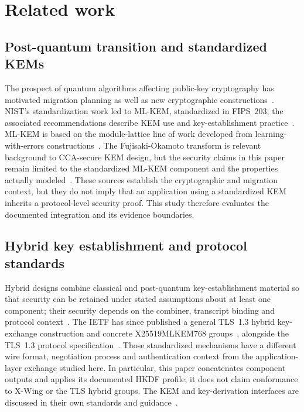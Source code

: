 \documentclass[pdflatex,sn-mathphys-num]{sn-jnl}
\begin{document}
\section{Related work}
\label{sec:related}
\subsection{Post-quantum transition and standardized KEMs}
The prospect of quantum algorithms affecting public-key cryptography has motivated migration planning as well as new cryptographic constructions~\cite{b1,b10,b27,b39}. NIST's standardization work led to ML-KEM, standardized in FIPS~203; the associated recommendations describe KEM use and key-establishment practice~\cite{b2,b9,b15}. ML-KEM is based on the module-lattice line of work developed from learning-with-errors constructions~\cite{b3,b4,b26,b28}. The Fujisaki-Okamoto transform is relevant background to CCA-secure KEM design, but the security claims in this paper remain limited to the standardized ML-KEM component and the properties actually modeled~\cite{b23}. These sources establish the cryptographic and migration context, but they do not imply that an application using a standardized KEM inherits a protocol-level security proof. This study therefore evaluates the documented integration and its evidence boundaries.

\subsection{Hybrid key establishment and protocol standards}
Hybrid designs combine classical and post-quantum key-establishment material so that security can be retained under stated assumptions about at least one component; their security depends on the combiner, transcript binding and protocol context~\cite{b8,b31,b32,b41}. The IETF has since published a general TLS~1.3 hybrid key-exchange construction and concrete X25519MLKEM768 groups~\cite{b17,b16}, alongside the TLS~1.3 protocol specification~\cite{b21}. Those standardized mechanisms have a different wire format, negotiation process and authentication context from the application-layer exchange studied here. In particular, this paper concatenates component outputs and applies its documented HKDF profile; it does not claim conformance to X-Wing or the TLS hybrid groups. The KEM and key-derivation interfaces are discussed in their own standards and guidance~\cite{b9,b20,b33}.
\end{document}
